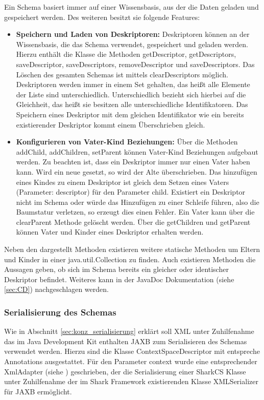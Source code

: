 \documentclass[a4paper]{article}
\begin{document}
	Ein Schema basiert immer auf einer Wissensbasis, aus der die Daten geladen und
	gespeichert werden. Des weiteren besitzt sie folgende Features:
	
	\newpage
	\begin{itemize}
		\item \textbf{Speichern und Laden von Deskriptoren:} Deskriptoren können
		an der Wissensbasis, die das Schema verwendet, gespeichert und
		geladen werden. Hierzu enthält die Klasse die Methoden getDescriptor,
		getDescriptors, saveDescriptor, saveDescriptors, removeDescriptor und
		saveDescriptors. Das Löschen des gesamten Schemas ist mittels 
		clearDescriptors möglich. Deskriptoren werden immer in einem Set gehalten,
		das heißt alle Elemente der Liste sind unterschiedlich. Unterschiedlich
		bezieht sich hierbei auf die Gleichheit, das heißt sie besitzen alle
		unterschiedliche Identifikatoren. Das Speichern eines Deskriptor mit dem
		gleichen Identifikator wie ein bereits existierender Deskriptor
		kommt einem Überschrieben gleich.
		\item \textbf{Konfigurieren von Vater-Kind Beziehungen:} Über die Methoden 
		addChild, addChildren, setParent können Vater-Kind Beziehungen aufgebaut
		werden. Zu beachten ist, dass ein Deskriptor immer nur einen Vater
		haben kann. Wird ein neue gesetzt, so wird der Alte überschrieben. Das
		hinzufügen eines Kindes zu einem Deskriptor ist gleich dem Setzen eines 
		Vaters (Parameter: descriptor) für den Parameter child. Existiert ein
		Deskriptor nicht im Schema oder würde das Hinzufügen zu einer
		Schleife führen, also die Baumstatur verletzen, so erzeugt dies einen
		Fehler.	Ein Vater kann über die clearParent Methode gelöscht werden. Über
		die getChildren	und getParent können Vater und Kinder eines Deskriptor
		erhalten werden.
	\end{itemize}
	
	Neben den dargestellt Methoden existieren weitere statische Methoden um Eltern
	und Kinder in einer java.util.Collection zu finden. Auch existieren Methoden die
	Aussagen geben, ob sich im Schema bereits ein gleicher oder identischer
	Deskriptor befindet. Weiteres kann in der JavaDoc Dokumentation 
	(siehe \autoref{sec:CD}) nachgeschlagen werden.
	
	\subsubsection{Serialisierung des Schemas}
	
	Wie in Abschnitt \ref{sec:konz_serialisierung} erklärt soll XML unter
	Zuhilfenahme das im Java Development Kit enthalten JAXB zum Serialisieren
	des Schemas verwendet werden. Hierzu sind die Klasse ContextSpaceDescriptor
	mit entspreche Annotations ausgestattet. Für den Parameter context wurde
	eine entsprechender XmlAdapter (siehe \cite{XmlAdapter}) geschrieben, der
	die Serialisierung einer SharkCS Klasse unter Zuhilfenahme der im Shark
	Framework existierenden Klasse XMLSerializer für JAXB ermöglicht. \\
	
\end{document}

